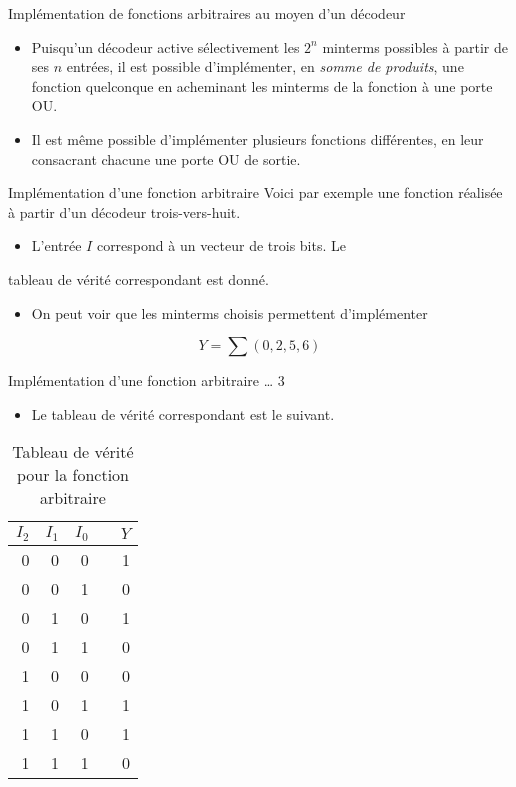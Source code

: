 \documentclass[presentation]{beamer}
\begin{document}
\begin{frame}[label={sec:orgf97707e}]{Implémentation de fonctions arbitraires au moyen d'un décodeur}
\begin{itemize}
\item Puisqu'un décodeur active sélectivement les \(2^n\) minterms possibles à partir de ses \(n\) entrées, il est possible d'implémenter, en \emph{somme de produits}, une fonction quelconque en acheminant les minterms de la fonction à une porte OU.

\item Il est même possible d'implémenter plusieurs fonctions différentes, en leur consacrant chacune une porte OU de sortie.
\end{itemize}
\end{frame}

\begin{frame}[label={sec:orgbb28237}]{Implémentation d'une fonction arbitraire}
Voici par exemple une fonction réalisée à partir d'un décodeur trois-vers-huit.
\begin{itemize}
\item L'entrée \(I\) correspond à un vecteur de trois bits. Le
\end{itemize}
tableau de vérité correspondant est donné.

\begin{itemize}
\item On peut voir que les minterms choisis permettent d'implémenter
\end{itemize}

$$ Y = \sum(0,2,5,6)$$
\end{frame}


\begin{frame}[label={sec:org81b5d82}]{Implémentation d'une fonction arbitraire \ldots{} 3}
\begin{itemize}
\item Le tableau de vérité correspondant est le suivant.
\end{itemize}

\begin{table}[htbp]
\caption{\label{tab:orgfc76a04}Tableau de vérité pour la fonction arbitraire}
\centering
\begin{tabular}{rrrlr}
\(I_2\) & \(I_1\) & \(I_0\) &  & \(Y\)\\[0pt]
\hline
0 & 0 & 0 &  & 1\\[0pt]
0 & 0 & 1 &  & 0\\[0pt]
0 & 1 & 0 &  & 1\\[0pt]
0 & 1 & 1 &  & 0\\[0pt]
1 & 0 & 0 &  & 0\\[0pt]
1 & 0 & 1 &  & 1\\[0pt]
1 & 1 & 0 &  & 1\\[0pt]
1 & 1 & 1 &  & 0\\[0pt]
\end{tabular}
\end{table}
\end{frame}
\end{document}
